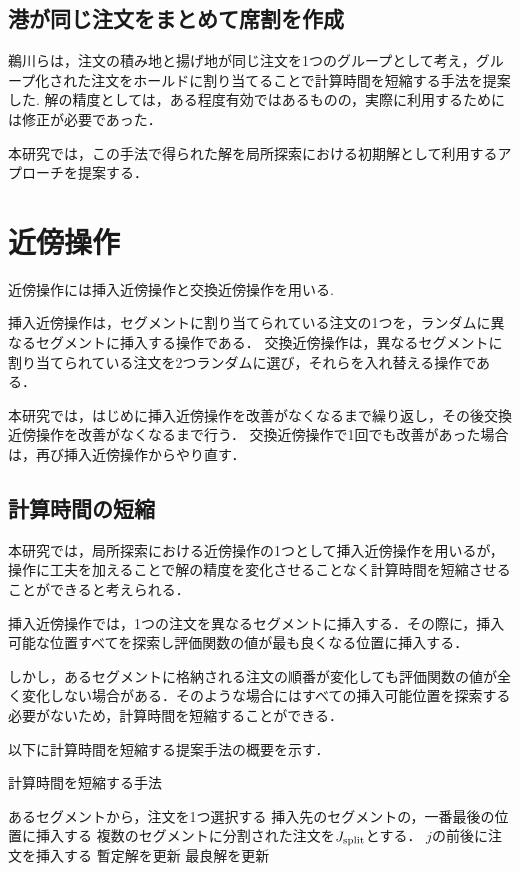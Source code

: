 \subsection{港が同じ注文をまとめて席割を作成}
\label{model2}
鵜川らは，注文の積み地と揚げ地が同じ注文を1つのグループとして考え，グループ化された注文をホールドに割り当てることで計算時間を短縮する手法を提案した\cite{ukawa}.
解の精度としては，ある程度有効ではあるものの，実際に利用するためには修正が必要であった．

本研究では，この手法で得られた解を局所探索における初期解として利用するアプローチを提案する．


\section{近傍操作}
近傍操作には挿入近傍操作と交換近傍操作を用いる.

挿入近傍操作は，セグメントに割り当てられている注文の1つを，ランダムに異なるセグメントに挿入する操作である．
交換近傍操作は，異なるセグメントに割り当てられている注文を2つランダムに選び，それらを入れ替える操作である．

本研究では，はじめに挿入近傍操作を改善がなくなるまで繰り返し，その後交換近傍操作を改善がなくなるまで行う．
交換近傍操作で1回でも改善があった場合は，再び挿入近傍操作からやり直す．


\subsection{計算時間の短縮}
\label{近傍操作の計算時間短縮}
本研究では，局所探索における近傍操作の1つとして挿入近傍操作を用いるが，操作に工夫を加えることで解の精度を変化させることなく計算時間を短縮させることができると考えられる．

挿入近傍操作では，1つの注文を異なるセグメントに挿入する．その際に，挿入可能な位置すべてを探索し評価関数の値が最も良くなる位置に挿入する．

しかし，あるセグメントに格納される注文の順番が変化しても評価関数の値が全く変化しない場合がある．そのような場合にはすべての挿入可能位置を探索する必要がないため，計算時間を短縮することができる．

以下に計算時間を短縮する提案手法の概要を示す．

\begin{algorithm}
 \caption{計算時間を短縮する手法}
 \label{algo1}
 \begin{algorithmic}[1]%
  \STATE あるセグメントから，注文を1つ選択する
  \STATE 挿入先のセグメントの，一番最後の位置に挿入する
  \STATE 複数のセグメントに分割された注文を$J_{\rm split}$とする．
  \STATE $j$の前後に注文を挿入する
  \STATE 暫定解を更新
  \ENDIF
  \ENDFOR
  \STATE 最良解を更新
  \ENDIF
 \end{algorithmic}
\end{algorithm}
